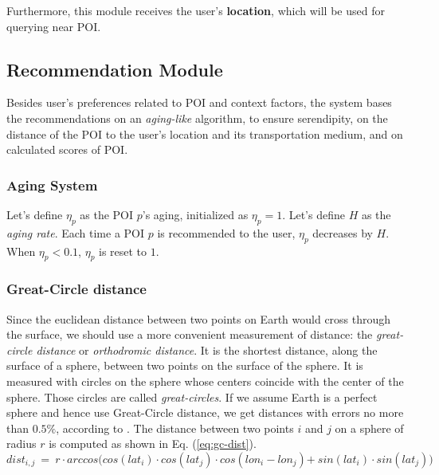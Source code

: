 Furthermore, this module receives the user's \textbf{location}, which will be used for querying near POI.

\vspace{-0.3cm}
\subsection{Recommendation Module}


Besides user's preferences related to POI and context factors, the system bases the recommendations on  an {\it aging-like} algorithm,  to ensure serendipity, on the distance of the POI to the user's location and its transportation medium, and on calculated scores of POI. 

\vspace{-0.1cm}
\subsubsection{\bf Aging System}

Let's define $\eta_p$ as the POI $p$'s aging, initialized as $\eta_p = 1$. Let's define $H$ as the \textit{aging rate}. Each time a POI $p$ is recommended to the user, $\eta_p$ decreases by $H$. When $\eta_p < 0.1$, $\eta_p$ is reset to $1$. 

\vspace{-0.1cm}
\subsubsection{\bf Great-Circle distance}
Since the euclidean distance between two points on Earth would cross through the surface, we should use a more convenient measurement of distance: the \textit{great-circle distance} or \textit{orthodromic distance}. It is the shortest distance, along the surface of a sphere, between two points on the surface of the sphere. It is measured with circles on the sphere whose centers coincide with the center of the sphere. Those circles are called \textit{great-circles}. If we assume Earth is a perfect sphere and hence use Great-Circle distance, we get distances with errors no more than $0.5\%$, according to \cite{1997admiralty}. 
The distance between two points $i$ and $j$ on a sphere of radius $r$ is computed as shown in Eq. (\ref{eq:gc-dist}).
\begin{equation} \label{eq:gc-dist}
        \scriptstyle{dist_{i,j} \ = \ r \cdot arccos (}  \scriptstyle{cos(lat_i) \cdot cos(lat_j) \cdot cos(lon_i - lon_j)} 
                                         \scriptstyle{+ \ sin(lat_i) \cdot sin(lat_j) )}
\end{equation}

